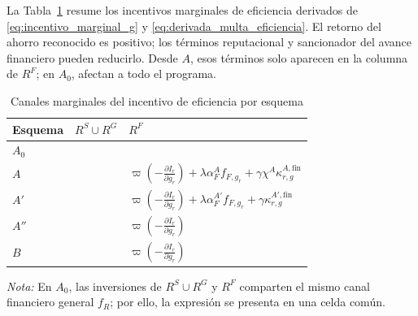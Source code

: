 La Tabla~\ref{tab:canal_eficiencia} resume los incentivos marginales de eficiencia derivados de \eqref{eq:incentivo_marginal_g} y \eqref{eq:derivada_multa_eficiencia}. El retorno del ahorro reconocido es positivo; los términos reputacional y sancionador del avance financiero pueden reducirlo. Desde \(A\), esos términos solo aparecen en la columna de \(R^F\); en \(A_0\), afectan a todo el programa.

\begin{table}[t]
\centering
\caption{Canales marginales del incentivo de eficiencia por esquema}
\label{tab:canal_eficiencia}
\scriptsize
\renewcommand{\arraystretch}{1.35}
\setlength{\tabcolsep}{5pt}
\begin{tabularx}{\textwidth}{
@{}
>{\centering\arraybackslash}p{}
>{\centering\arraybackslash}p{}
>{\centering\arraybackslash}X
@{}
}
\hline
\textbf{Esquema}
&
\textbf{\(R^{S}\cup R^{G}\)}
&
\textbf{\(R^{F}\)}
\\
\hline
\(A_0\)
&
\multicolumn{2}{c}{
\(\displaystyle
\varpi^{A_0}
\left(-\frac{\partial I_r}{\partial g_r}\right)
+
\lambda^{A_0}\alpha_F^{A_0}f_{R,g_r}
+
\gamma^{A_0}\chi^{A_0}\kappa_{r,g}^{A_0,\mathrm{fin}}
\)
}
\\[8pt]
\(A\)
&
\multirow{4}{*}{\(\displaystyle
\varpi
\left(-\frac{\partial I_r}{\partial g_r}\right)
\)}
&
\(\displaystyle
\varpi
\left(-\frac{\partial I_r}{\partial g_r}\right)
+
\lambda\alpha_F^{A}f_{F,g_r}
+
\gamma\chi^A \kappa_{r,g}^{A,\mathrm{fin}}
\)
\\[8pt]
\(A'\)
&

&
\(\displaystyle
\varpi
\left(-\frac{\partial I_r}{\partial g_r}\right)
+
\lambda\alpha_F^{A'}f_{F,g_r}
+
\gamma \kappa_{r,g}^{A',\mathrm{fin}}
\)
\\[8pt]
\(A''\)
&

&
\(\displaystyle
\varpi
\left(-\frac{\partial I_r}{\partial g_r}\right)
\)
\\[8pt]
\(B\)
&

&
\(\displaystyle
\varpi
\left(-\frac{\partial I_r}{\partial g_r}\right)
\)
\\
\hline
\end{tabularx}
\vspace{1mm}
\begin{minipage}{0.98\textwidth}
\raggedright
\footnotesize
\textit{Nota:} En \(A_0\), las inversiones de \(R^{S}\cup R^{G}\) y \(R^{F}\) comparten el mismo canal financiero general \(f_R\); por ello, la expresión se presenta en una celda común.
\end{minipage}
\end{table}

